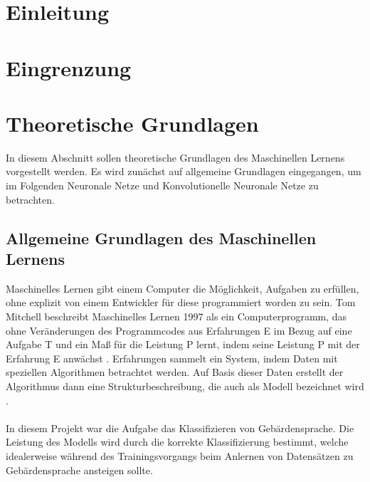 \documentclass[11pt,bibliography=totocnumbered]{scrartcl}
\begin{document}
\section{Einleitung}
\section{Eingrenzung}
\section{Theoretische Grundlagen}
In diesem Abschnitt sollen theoretische Grundlagen des Maschinellen Lernens vorgestellt werden. Es wird zunächst auf allgemeine Grundlagen eingegangen, um im Folgenden Neuronale Netze und Konvolutionelle Neuronale Netze zu betrachten.
\subsection{Allgemeine Grundlagen des Maschinellen Lernens}
Maschinelles Lernen gibt einem Computer die Möglichkeit, Aufgaben zu erfüllen, ohne explizit von einem Entwickler für diese programmiert worden zu sein. Tom Mitchell beschreibt Maschinelles Lernen 1997 als ein Computerprogramm, das ohne Veränderungen des Programmcodes aus Erfahrungen E im Bezug auf eine Aufgabe T und ein Maß für die Leistung P lernt, indem seine Leistung P mit der Erfahrung E anwächst \cite[S. 4]{MACHINE_LEARNING}. Erfahrungen sammelt ein System, indem Daten mit speziellen Algorithmen betrachtet werden. Auf Basis dieser Daten erstellt der Algorithmus dann eine Strukturbeschreibung, die auch als Modell bezeichnet wird \cite[S. 2]{DEEP_LEARNING}.
\\\\
In diesem Projekt war die Aufgabe das Klassifizieren von Gebärdensprache. Die Leistung des Modells wird durch die korrekte Klassifizierung bestimmt, welche idealerweise während des Trainingsvorgangs beim Anlernen von Datensätzen zu Gebärdensprache ansteigen sollte.
\end{document}
